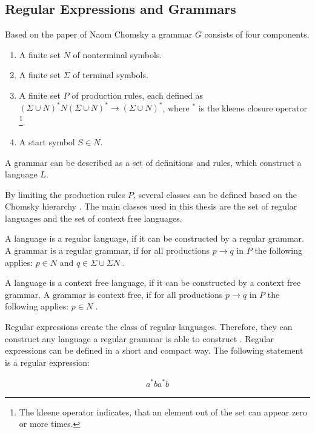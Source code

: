 \subsection{Regular Expressions and Grammars}

Based on the paper of Naom Chomsky \cite{chomsky} a grammar $G$ consists of four components. 

\begin{enumerate}
    \item A finite set $N$ of nonterminal symbols.
    \item A finite set $\Sigma$ of terminal symbols.
    \item A finite set $P$ of production rules, each defined as $(\Sigma \cup N)^*N(\Sigma \cup N)^* \rightarrow (\Sigma \cup N)^*$, where $^*$ is the kleene closure operator \cite[page 15]{theoretical_comp_sci}\footnote{The kleene operator indicates, that an element out of the set can appear zero or more times.}.
    \item A start symbol $S \in N$.
\end{enumerate}

A grammar can be described as a set of definitions and rules, which construct a language $L$.

By limiting the production rules $P$, several classes can be defined based on the Chomsky hierarchy \cite[pages 512-513]{formal_languages_and_automata}.
The main classes used in this thesis are the set of regular languages and the set of context free languages.

A language is a regular language, if it can be constructed by a regular grammar.
A grammar is a regular grammar, if for all productions $p \to q$ in $P$ the following applies: $p \in N$ and $q \in \Sigma \cup \Sigma N$ \cite[pages 32]{theoretical_comp_sci}.

A language is a context free language, if it can be constructed by a context free grammar.
A grammar is context free, if for all productions $p \to q$ in $P$ the following applies: $p \in N$ \cite[page 37]{theoretical_comp_sci}.

Regular expressions create the class of regular languages. Therefore, they can construct any language a regular grammar is able to construct \cite[pages 25-32]{theoretical_comp_sci}.
Regular expressions can be defined in a short and compact way.
The following statement is a regular expression:

\begin{align*}
a^*ba^*b
\end{align*}

